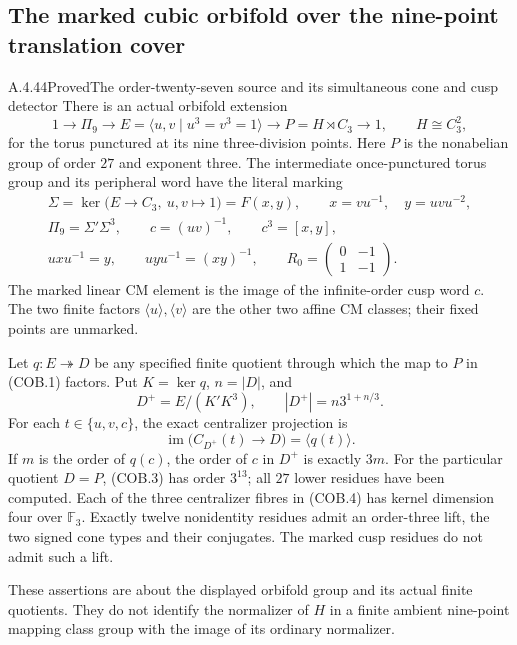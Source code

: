 \subsection{The marked cubic orbifold over the nine-point translation cover}

\begin{result}{A.4.44}{Proved}{The order-twenty-seven source and its simultaneous cone and cusp detector}
There is an actual orbifold extension
\[
 1\longrightarrow\Pi_9\longrightarrow
 E=\langle u,v\mid u^3=v^3=1\rangle
 \longrightarrow P=H\rtimes C_3\longrightarrow1,
 \qquad H\cong C_3^2,
                                                               \tag{COB.1}
\]
for the torus punctured at its nine three-division points.
Here $P$ is the nonabelian group of order $27$ and
exponent three. The intermediate once-punctured torus
group and its peripheral word have the literal marking
\[
 \begin{gathered}
 \Sigma=\ker\bigl(E\to C_3,\ u,v\mapsto1\bigr)
       =F(x,y),\qquad
 x=vu^{-1},\quad y=uvu^{-2},\\
 \Pi_9=\Sigma'\Sigma^3,\qquad
 c=(uv)^{-1},\qquad c^3=[x,y],\\
 uxu^{-1}=y,\qquad uyu^{-1}=(xy)^{-1},\qquad
 R_0=\begin{pmatrix}0&-1\\1&-1\end{pmatrix}.
 \end{gathered}
                                                               \tag{COB.2}
\]
The marked linear CM element is the image of the
infinite-order cusp word $c$. The two finite factors
$\langle u\rangle,\langle v\rangle$ are the other
two affine CM classes; their fixed points are unmarked.

Let $q:E\twoheadrightarrow D$ be any specified finite
quotient through which the map to $P$ in (COB.1)
factors. Put $K=\ker q$, $n=|D|$, and
\[
 D^+=E/(K'K^3),\qquad
 |D^+|=n3^{1+n/3}.
                                                               \tag{COB.3}
\]
For each $t\in\{u,v,c\}$, the exact centralizer
projection is
\[
 \operatorname{im}\bigl(C_{D^+}(t)\longrightarrow D\bigr)
                  =\langle q(t)\rangle.
                                                               \tag{COB.4}
\]
If $m$ is the order of $q(c)$, the order of $c$ in
$D^+$ is exactly $3m$. For the particular quotient
$D=P$, (COB.3) has order $3^{13}$; all $27$ lower
residues have been computed. Each of the three
centralizer fibres in (COB.4) has kernel dimension
four over $\mathbb F_3$. Exactly twelve nonidentity
residues admit an order-three lift, the two signed
cone types and their conjugates. The marked cusp
residues do not admit such a lift.

These assertions are about the displayed orbifold
group and its actual finite quotients. They do not
identify the normalizer of $H$ in a finite ambient
nine-point mapping class group with the image of its
ordinary normalizer.
\end{result}

